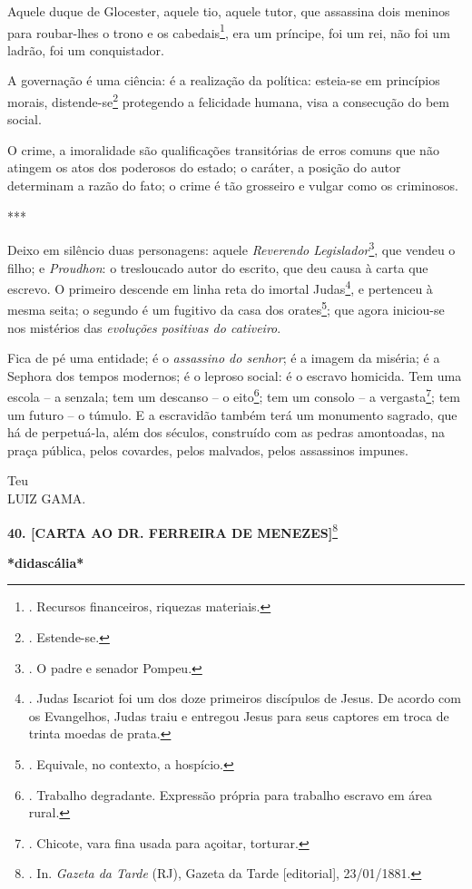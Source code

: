 Aquele duque de Glocester, aquele tio, aquele tutor, que assassina dois
meninos para roubar-lhes o trono e os cabedais\footnote{. Recursos
  financeiros, riquezas materiais.}, era um príncipe, foi um rei, não
foi um ladrão, foi um conquistador.

A governação é uma ciência: é a realização da política: esteia-se em
princípios morais, distende-se\footnote{. Estende-se.} protegendo a
felicidade humana, visa a consecução do bem social.

O crime, a imoralidade são qualificações transitórias de erros comuns
que não atingem os atos dos poderosos do estado; o caráter, a posição do
autor determinam a razão do fato; o crime é tão grosseiro e vulgar como
os criminosos.

***

Deixo em silêncio duas personagens: aquele \emph{Reverendo
Legislador}\footnote{. O padre e senador Pompeu.}, que vendeu o filho; e
\emph{Proudhon}: o tresloucado autor do escrito, que deu causa à carta
que escrevo. O primeiro descende em linha reta do imortal
Judas\footnote{. Judas Iscariot foi um dos doze primeiros discípulos de
  Jesus. De acordo com os Evangelhos, Judas traiu e entregou Jesus para
  seus captores em troca de trinta moedas de prata.}, e pertenceu à
mesma seita; o segundo é um fugitivo da casa dos orates\footnote{.
  Equivale, no contexto, a hospício.}; que agora iniciou-se nos
mistérios das \emph{evoluções positivas do cativeiro}.

Fica de pé uma entidade; é o \emph{assassino do senhor}; é a imagem da
miséria; é a Sephora dos tempos modernos; é o leproso social: é o
escravo homicida. Tem uma escola -- a senzala; tem um descanso -- o
eito\footnote{. Trabalho degradante. Expressão própria para trabalho
  escravo em área rural.}; tem um consolo -- a vergasta\footnote{.
  Chicote, vara fina usada para açoitar, torturar.};
tem um futuro -- o túmulo.
E a escravidão também terá um monumento sagrado, que há de perpetuá-la,
além dos séculos, construído com as pedras amontoadas, na praça pública,
pelos covardes, pelos malvados, pelos assassinos impunes.

Teu\\
LUIZ GAMA.

\textbf{40. {[}CARTA AO DR. FERREIRA DE MENEZES{]}}\footnote{. In.
  \emph{Gazeta da Tarde} (RJ), Gazeta da Tarde {[}editorial{]},
  23/01/1881.}

\textbf{*didascália*}

